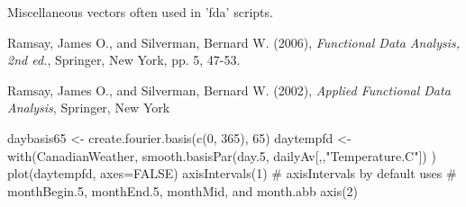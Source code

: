 \documentclass{article}
\begin{document}
\begin{Details}\relax
Miscellaneous vectors often used in 'fda' scripts.
\end{Details}
\begin{Source}\relax
Ramsay, James O., and Silverman, Bernard W. (2006), \emph{Functional
Data Analysis, 2nd ed.}, Springer, New York, pp. 5, 47-53.

Ramsay, James O., and Silverman, Bernard W. (2002), \emph{Applied
Functional Data Analysis}, Springer, New York
\end{Source}
\begin{SeeAlso}\relax
{} 
\end{SeeAlso}
\begin{Examples}
\begin{ExampleCode}
daybasis65 <- create.fourier.basis(c(0, 365), 65)
daytempfd <- with(CanadianWeather, smooth.basisPar(day.5, 
    dailyAv[,,"Temperature.C"]) )
plot(daytempfd, axes=FALSE)
axisIntervals(1) 
# axisIntervals by default uses
# monthBegin.5, monthEnd.5, monthMid, and month.abb
axis(2)  
\end{ExampleCode}
\end{Examples}
\end{document}
